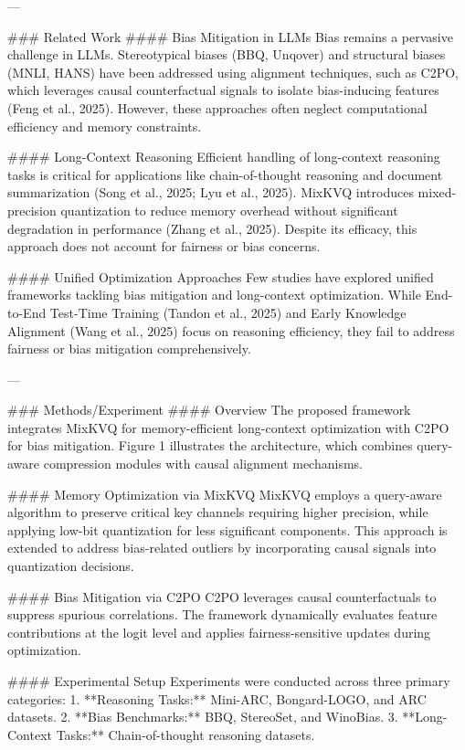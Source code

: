 ---

### Related Work
#### Bias Mitigation in LLMs
Bias remains a pervasive challenge in LLMs. Stereotypical biases (BBQ, Unqover) and structural biases (MNLI, HANS) have been addressed using alignment techniques, such as C2PO, which leverages causal counterfactual signals to isolate bias-inducing features (Feng et al., 2025). However, these approaches often neglect computational efficiency and memory constraints.

#### Long-Context Reasoning
Efficient handling of long-context reasoning tasks is critical for applications like chain-of-thought reasoning and document summarization (Song et al., 2025; Lyu et al., 2025). MixKVQ introduces mixed-precision quantization to reduce memory overhead without significant degradation in performance (Zhang et al., 2025). Despite its efficacy, this approach does not account for fairness or bias concerns.

#### Unified Optimization Approaches
Few studies have explored unified frameworks tackling bias mitigation and long-context optimization. While End-to-End Test-Time Training (Tandon et al., 2025) and Early Knowledge Alignment (Wang et al., 2025) focus on reasoning efficiency, they fail to address fairness or bias mitigation comprehensively.

---

### Methods/Experiment
#### Overview
The proposed framework integrates MixKVQ for memory-efficient long-context optimization with C2PO for bias mitigation. Figure 1 illustrates the architecture, which combines query-aware compression modules with causal alignment mechanisms.

#### Memory Optimization via MixKVQ
MixKVQ employs a query-aware algorithm to preserve critical key channels requiring higher precision, while applying low-bit quantization for less significant components. This approach is extended to address bias-related outliers by incorporating causal signals into quantization decisions.

#### Bias Mitigation via C2PO
C2PO leverages causal counterfactuals to suppress spurious correlations. The framework dynamically evaluates feature contributions at the logit level and applies fairness-sensitive updates during optimization.

#### Experimental Setup
Experiments were conducted across three primary categories:
1. **Reasoning Tasks:** Mini-ARC, Bongard-LOGO, and ARC datasets.
2. **Bias Benchmarks:** BBQ, StereoSet, and WinoBias.
3. **Long-Context Tasks:** Chain-of-thought reasoning datasets.

